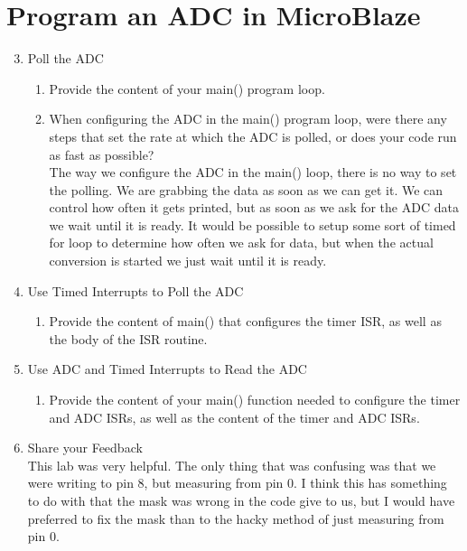 \documentclass[10pt]{article}
\begin{document}
  \section*{Program an ADC in MicroBlaze}
    \begin{enumerate}
      \setcounter{enumi}{2}
      \item Poll the ADC 
      \begin{enumerate}
        \item Provide the content of your main() program loop.\\[1em]
          
            
        \item When configuring the ADC in the main() program loop, were there any steps that set the rate at which the ADC is polled, or does your code run as fast as possible?\\[1em]
          The way we configure the ADC in the main() loop, there is no way to set the polling. We are grabbing the data as soon as we can get it. We can control how often it gets printed, but as soon as we ask for the ADC data we wait until it is ready. It would be possible to setup some sort of timed for loop to determine how often we ask for data, but when the actual conversion is started we just wait until it is ready.
      \end{enumerate}

      \item Use Timed Interrupts to Poll the ADC
        \begin{enumerate}
          \item Provide the content of main() that configures the timer ISR, as well as the body of the ISR routine.\\[1em]
            
            
        \end{enumerate}

      \item Use ADC and Timed Interrupts to Read the ADC
        \begin{enumerate}
          \item Provide the content of your main() function needed to configure the timer and ADC ISRs, as well as the content of the timer and ADC ISRs.\\[1em]
            
        \end{enumerate}

      \item Share your Feedback\\[1em]
        This lab was very helpful. The only thing that was confusing was that we were writing to pin 8, but measuring from pin 0. I think this has something to do with that the mask was wrong in the code give to us, but I would have preferred to fix the mask than to the hacky method of just measuring from pin 0.
    \end{enumerate}
 
\end{document}
